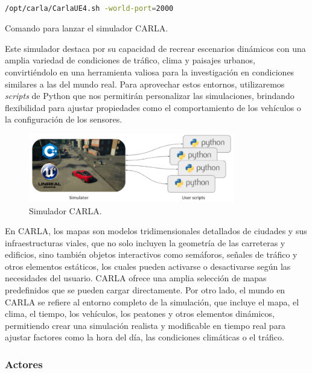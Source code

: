 \begin{code}[h]
\begin{lstlisting}[language=bash]

/opt/carla/CarlaUE4.sh -world-port=2000

\end{lstlisting}
\caption[Comando para lanzar el simulador CARLA]{Comando para lanzar el simulador CARLA.}
\label{cod:cmdcarla}
\end{code}

Este simulador destaca por su capacidad de recrear escenarios dinámicos con una amplia variedad de condiciones de tráfico, clima y paisajes urbanos, convirtiéndolo en una herramienta valiosa para la investigación en condiciones similares a las del mundo real. Para aprovechar estos entornos, utilizaremos \textit{scripts} de Python que nos permitirán personalizar las simulaciones, brindando flexibilidad para ajustar propiedades como el comportamiento de los vehículos o la configuración de los sensores.

\begin{figure}[ht]
\begin{center}
\includegraphics[width=9cm]{figs/Plataformas_Desarollo/carla.png}
\end{center}
\caption{Simulador CARLA.}
\label{carla}
\end{figure}

En CARLA, los mapas son modelos tridimensionales detallados de ciudades y sus infraestructuras viales, que no solo incluyen la geometría de las carreteras y edificios, sino también objetos interactivos como semáforos, señales de tráfico y otros elementos estáticos, los cuales pueden activarse o desactivarse según las necesidades del usuario. CARLA ofrece una amplia selección de mapas predefinidos que se pueden cargar directamente. Por otro lado, el mundo en CARLA se refiere al entorno completo de la simulación, que incluye el mapa, el clima, el tiempo, los vehículos, los peatones y otros elementos dinámicos, permitiendo crear una simulación realista y modificable en tiempo real para ajustar factores como la hora del día, las condiciones climáticas o el tráfico.

\subsubsection{Actores}

